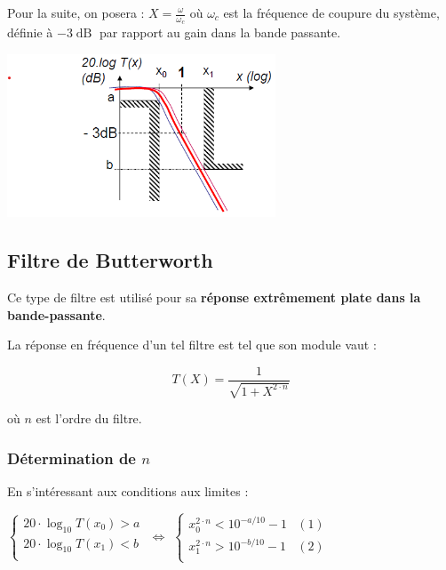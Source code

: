 \documentclass[a4paper,french]{paper}
\begin{document}
\bigskip

Pour la suite, on posera : $X = \frac{\omega}{\omega_c}$ où $\omega_c$ est la fréquence de coupure du système, définie à $-3\operatorname{dB}$ par rapport au gain dans la bande passante.


\begin{center}
	\includegraphics[width=8cm]{images/gabarit_butter.png}
\end{center}

\newpage
\subsection*{Filtre de Butterworth}

Ce type de filtre est utilisé pour sa \textbf{réponse extrêmement plate dans la bande-passante}.


La réponse en fréquence d'un tel filtre est tel que son module vaut :

$$ T(X) = \frac{1}{\sqrt{1 + X^{2\cdot n}}}$$

où $n$ est l'ordre du filtre.

\subsubsection*{Détermination de $n$}
En s'intéressant aux conditions aux limites :


$
\left\{
    \begin{array}{ll}
        20 \cdot \log_{10} T(x_0) > a \\
        20 \cdot \log_{10} T(x_1) < b \\
    \end{array}    
\right. 
$
$\Leftrightarrow$
$
\left\{
    \begin{array}{ll}
        x_0^{2\cdot n} < 10^{-a/10} - 1 & (1)\\
        x_1^{2\cdot n} > 10^{-b/10} - 1 & (2)\\
    \end{array}    
\right. 
$
\end{document}
